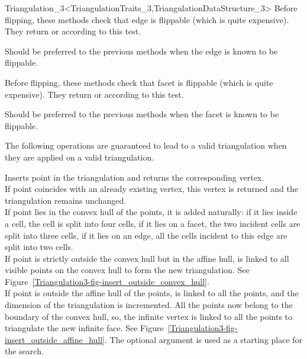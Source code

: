 \begin{ccRefClass}{Triangulation_3<TriangulationTraits_3,TriangulationDataStructure_3>}
\ccGlue
{}
{Before flipping, these methods check that edge  is
flippable (which is quite expensive). They return  or
 according to this test.}

\ccGlue
{}
{Should be preferred to the previous methods when the edge is
known to be flippable.
}

\ccGlue
{}
{Before flipping, these methods check that facet  is
flippable (which is quite expensive). They return  or
 according to this test.} 

\ccGlue
{}
{Should be preferred to the previous methods when the facet is
known to be flippable.
}


The following operations are guaranteed to lead to a valid triangulation 
when they are applied on a valid triangulation.

{Inserts point  in the triangulation and returns the corresponding
 vertex.\\
If point  coincides with an already existing vertex, this 
vertex is returned and the triangulation remains unchanged.\\
If point  lies in the convex hull of the points, it is added
naturally: if it lies inside a cell, the cell is split into four
cells, if it lies on a facet, the two incident cells are split into
three cells, if it lies on an edge, all the cells incident to this
edge are split into two cells.\\
If point  is strictly outside the convex hull but in the affine
hull,  is linked to all visible points on the convex hull to
form the new triangulation. See
Figure~\ref{Triangulation3-fig-insert_outside_convex_hull}.\\  
If point  is outside the affine hull of the points,  is
linked to all the points, and the dimension of the triangulation is
incremented. All the points now belong to the boundary of the convex
hull, so, the infinite vertex is linked to all the points to
triangulate the new infinite face. See 
Figure~\ref{Triangulation3-fig-insert_outside_affine_hull}.
The optional argument  is used as a starting place for the search.}


\end{ccRefClass}
